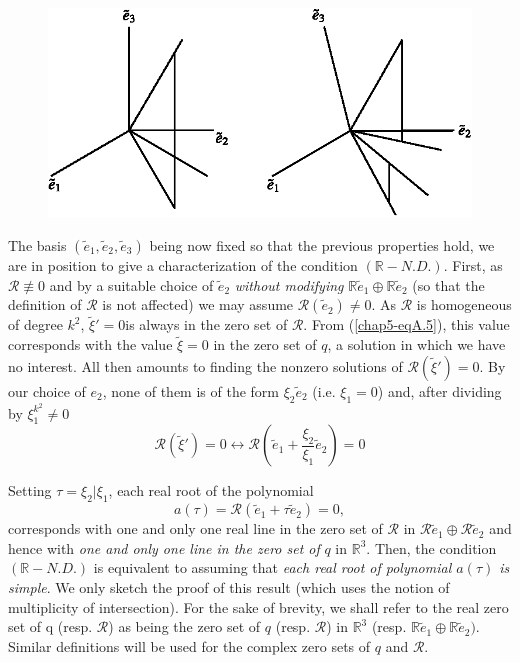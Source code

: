 \renewcommand{\thefigure}{\Alph{section}.\arabic{figure}}
\setcounter{section}{1}
\setcounter{figure}{0}
\begin{figure}[H]
\centering
\includegraphics{figure/fig76-A-1.eps}
\caption{}
\end{figure}

The basis $(\widetilde{e}_{1}, \widetilde{e}_{2}, \widetilde{e}_{3})$ being now fixed so that the previous properties hold, we are in position to give a characterization of the condition $(\mathbb{R}-N.D.)$. First, as $\mathscr{R} \nequiv 0$ and by a suitable choice of $\widetilde{e}_{2}$ {\em without modifying} $\mathbb{R} \widetilde{e}_{1} \oplus \mathbb{R}\widetilde{e}_{2}$ (so that the definition of $\mathscr{R}$ is not affected) we may assume $\mathscr{R}(\widetilde{e}_{2}) \neq 0$. As $\mathscr{R}$ is homogeneous of degree $k^{2}$, $\widetilde{\xi}' = 0$\pageoriginale is always in the zero set of $\mathscr{R}$. From (\ref{chap5-eqA.5}), this value corresponds with the value $\widetilde{\xi} = 0$ in the zero set of $q$, a solution in which we have no interest. All then amounts to finding the nonzero solutions of $\mathscr{R}(\widetilde{\xi}') = 0$. By our choice of $e_{2}$, none of them is of the form $\xi_{2} \widetilde{e}_{2}$ (i.e. $\xi_{1} = 0$) and, after dividing by $\xi_{1}^{k^{2}} \neq 0$
$$
\mathscr{R}(\widetilde{\xi}') = 0 \leftrightarrow \mathscr{R}(\widetilde{e}_{1} + \frac{\xi_{2}}{\xi_{1}} \widetilde{e}_{2}) = 0
$$    

Setting $\tau = \xi_{2} | \xi_{1}$, each real root of the polynomial
\begin{equation*}
a(\tau) = \mathscr{R}(\widetilde{e}_{1} + \tau \widetilde{e}_{2}) = 0,\tag{A.8}\label{chap5-eqA.8}
\end{equation*}
corresponds with one and only one real line in the zero set of $\mathscr{R}$ in $\mathscr{R} \widetilde{e}_{1} \oplus \mathscr{R} \widetilde{e}_{2}$ and hence with {\em one and only one line in the zero set of} $q$ in $\mathbb{R}^{3}$. Then, the condition $(\mathbb{R}-N.D.)$ is equivalent to assuming that {\em each real root of polynomial $a(\tau)$ is simple}. We only sketch the proof of this result (which uses the notion of multiplicity of intersection). For the sake of brevity, we shall refer to the real zero set of q (resp. $\mathscr{R}$) as being the zero set of $q$ (resp. $\mathscr{R}$) in $\mathbb{R}^{3}$ (resp. $\mathbb{R} \widetilde{e}_{1} \oplus \mathbb{R} \widetilde{e}_{2})$. Similar definitions will be used for the complex zero sets of $q$ and $\mathscr{R}$.

